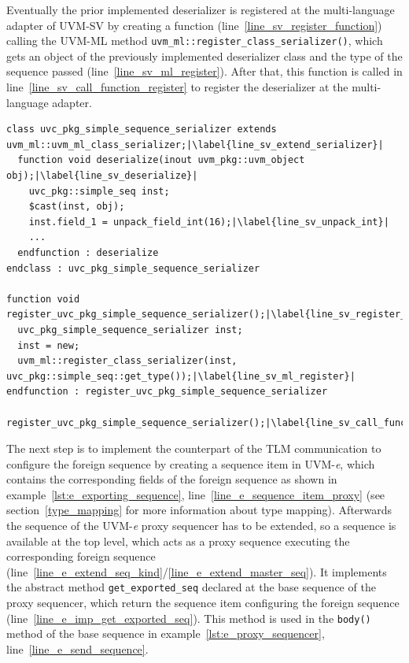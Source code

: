 Eventually the prior implemented deserializer is registered at the multi-language adapter of UVM-SV by creating a function (line~\ref{line_sv_register_function}) calling the UVM-ML method \lstinline$uvm_ml::register_class_serializer()$, which gets an object of the previously implemented deserializer class and the type of the sequence passed (line~\ref{line_sv_ml_register}). After that, this function is called in line~\ref{line_sv_call_function_register} to register the deserializer at the multi-language adapter.
\lstset{language=SystemVerilog, numbers = left, escapechar=|, breaklines=true}
\begin{lstlisting}[frame=htrbl, caption={SystemVerilog: deserializer for foreign sequences},
label={lst:SV_deserializer_sequence}]
class uvc_pkg_simple_sequence_serializer extends uvm_ml::uvm_ml_class_serializer;|\label{line_sv_extend_serializer}|
  function void deserialize(inout uvm_pkg::uvm_object obj);|\label{line_sv_deserialize}|
    uvc_pkg::simple_seq inst;
    $cast(inst, obj);
    inst.field_1 = unpack_field_int(16);|\label{line_sv_unpack_int}|
    ...
  endfunction : deserialize
endclass : uvc_pkg_simple_sequence_serializer

function void register_uvc_pkg_simple_sequence_serializer();|\label{line_sv_register_function}|
  uvc_pkg_simple_sequence_serializer inst;
  inst = new;
  uvm_ml::register_class_serializer(inst, uvc_pkg::simple_seq::get_type());|\label{line_sv_ml_register}|
endfunction : register_uvc_pkg_simple_sequence_serializer

register_uvc_pkg_simple_sequence_serializer();|\label{line_sv_call_function_register}|
\end{lstlisting}
The next step is to implement the counterpart of the TLM communication to configure the foreign sequence by creating a sequence item in UVM-\textit{e}, which contains the corresponding fields of the foreign sequence as shown in example~\ref{lst:e_exporting_sequence}, line~\ref{line_e_sequence_item_proxy} (see section~\ref{type_mapping} for more information about type mapping). Afterwards the sequence of the UVM-\textit{e} proxy sequencer has to be extended, so a sequence is available at the top level, which acts as a proxy sequence executing the corresponding foreign sequence (line~\ref{line_e_extend_seq_kind}/\ref{line_e_extend_master_seq}). It implements the abstract method \lstinline$get_exported_seq$ declared at the base sequence of the proxy sequencer, which return the sequence item configuring the foreign sequence (line~\ref{line_e_imp_get_exported_seq}). This method is used in the \lstinline$body()$ method of the base sequence in example~\ref{lst:e_proxy_sequencer}, line~\ref{line_e_send_sequence}.\\
